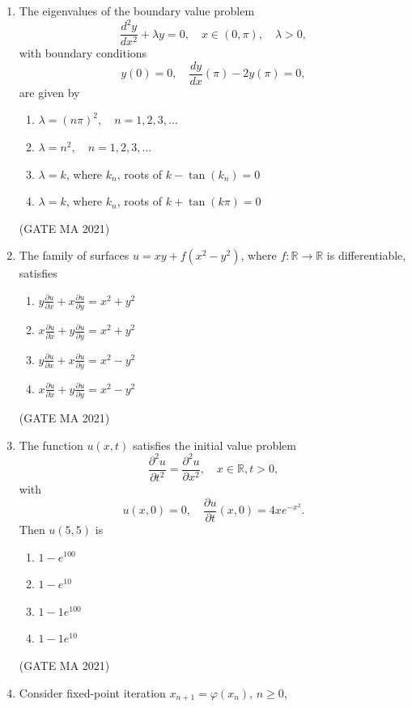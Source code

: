 \documentclass[journal,12pt,onecolumn]{IEEEtran}
\theoremstyle{remark}
\begin{document}
\begin{enumerate}
    \item The eigenvalues of the boundary value problem
    $$
    \frac{d^2 y}{dx^2} + \lambda y = 0, \quad x \in (0, \pi), \quad \lambda > 0,
    $$
    with boundary conditions
    $$
    y(0) = 0, \quad \frac{dy}{dx}(\pi) - 2 y(\pi) = 0,
    $$
    are given by
    \begin{enumerate}
        \item $\lambda = (n \pi)^2, \quad n=1,2,3,\dots$
        \item $\lambda = n^2, \quad n=1,2,3,\dots$
        \item $\lambda = k$, where $k_n$, roots of $k - \tan(k_n) = 0$
        \item $\lambda = k$, where $k_n$, roots of $k + \tan(k \pi) = 0$
    \end{enumerate}
    \hfill(GATE MA 2021)
    \item The family of surfaces $u = xy + f(x^2 - y^2)$, where $f:\mathbb{R} \to \mathbb{R}$ is differentiable, satisfies
    \begin{enumerate}
        \item $y \frac{\partial u}{\partial x} + x \frac{\partial u}{\partial y} = x^2 + y^2$
        \item $x \frac{\partial u}{\partial x} + y \frac{\partial u}{\partial y} = x^2 + y^2$
        \item $y \frac{\partial u}{\partial x} + x \frac{\partial u}{\partial y} = x^2 - y^2$
        \item $x \frac{\partial u}{\partial x} + y \frac{\partial u}{\partial y} = x^2 - y^2$
    \end{enumerate}
\hfill(GATE MA 2021)
    \item The function $u(x,t)$ satisfies the initial value problem
    \[
    \frac{\partial^2 u}{\partial t^2} = \frac{\partial^2 u}{\partial x^2}, \quad x \in \mathbb{R}, t > 0,
    \]
    with
    \[
    u(x,0) = 0, \quad \frac{\partial u}{\partial t}(x,0) = 4x e^{-x^2}.
    \]
    Then $u(5,5)$ is
    \begin{enumerate}
        \item $1 - e^{100}$
        \item $1 - e^{10}$
        \item $1 - 1e^{100}$
        \item $1 - 1e^{10}$
    \end{enumerate}
    \hfill(GATE MA 2021)
    \item Consider fixed-point iteration $x_{n+1} = \varphi(x_n)$, $n \ge 0$,

\end{enumerate}
\end{document}
